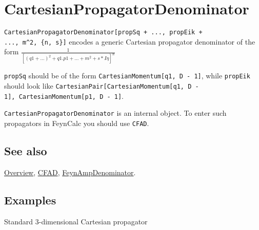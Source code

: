 \documentclass[../FeynCalcManual.tex]{subfiles}
\begin{document}
\hypertarget{cartesianpropagatordenominator}{
\section{CartesianPropagatorDenominator}\label{cartesianpropagatordenominator}}

\texttt{CartesianPropagatorDenominator[\allowbreak{}propSq  + ...,\ \allowbreak{}propEik + ...,\ \allowbreak{}m^2,\ \allowbreak{}\{\allowbreak{}n,\ \allowbreak{}s\}]}
encodes a generic Cartesian propagator denominator of the form
\(\frac{1}{[(q1+...)^2 + q1.p1 + ... + m^2 + s*I \eta]^n}\)

\texttt{propSq} should be of the form
\texttt{CartesianMomentum[\allowbreak{}q1,\ \allowbreak{}D - 1]}, while
\texttt{propEik} should look like
\texttt{CartesianPair[\allowbreak{}CartesianMomentum[\allowbreak{}q1,\ \allowbreak{}D - 1],\ \allowbreak{}CartesianMomentum[\allowbreak{}p1,\ \allowbreak{}D - 1]}.

\texttt{CartesianPropagatorDenominator} is an internal object. To enter
such propagators in FeynCalc you should use \texttt{CFAD}.

\subsection{See also}

\hyperlink{toc}{Overview}, \hyperlink{cfad}{CFAD},
\hyperlink{feynampdenominator}{FeynAmpDenominator}.

\subsection{Examples}

Standard \(3\)-dimensional Cartesian propagator

\begin{Shaded}
\begin{Highlighting}[]
\OperatorTok{[}\OperatorTok{[}\OperatorTok{[}\OperatorTok{,}  \SpecialCharTok{{-}} \OperatorTok{],} \OperatorTok{,} \SpecialCharTok{\^{}}\OperatorTok{,} \OperatorTok{\{}\OperatorTok{,} \SpecialCharTok{{-}}\OperatorTok{\}]]}
\end{Highlighting}
\end{Shaded}
\end{document}
